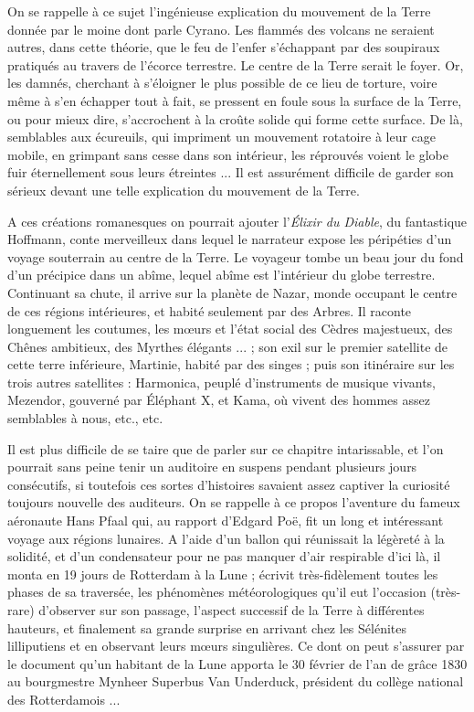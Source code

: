 \documentclass[a4paper, 11pt, oneside, landscape]{article}
\begin{document}
On se rappelle à ce sujet l'ingénieuse explication du mouvement de la Terre donnée par le moine dont parle Cyrano. Les flammés des volcans ne seraient autres, dans cette théorie, que le feu de l'enfer s'échappant par des soupiraux pratiqués au travers de l'écorce terrestre. Le centre de la Terre serait le foyer. Or, les damnés, cherchant à s'éloigner le plus possible de ce lieu de torture, voire même à s'en échapper tout à fait, se pressent en foule sous la surface de la Terre, ou pour mieux dire, s'accrochent à la croûte solide qui forme cette surface. De là, semblables aux écureuils, qui impriment un mouvement rotatoire à leur cage mobile, en grimpant sans cesse dans son intérieur, les réprouvés voient le globe fuir éternellement sous leurs étreintes ... Il est assurément difficile de garder son sérieux devant une telle explication du mouvement de la Terre.

A ces créations romanesques on pourrait ajouter l'\emph{Élixir du Diable}, du fantastique Hoffmann, conte merveilleux dans lequel le narrateur expose les péripéties d'un voyage souterrain au centre de la Terre. Le voyageur tombe un beau jour du fond d'un précipice dans un abîme, lequel abîme est l'intérieur du globe terrestre. Continuant sa chute, il arrive sur la planète de Nazar, monde occupant le centre de ces régions intérieures, et habité seulement par des Arbres. Il raconte longuement les coutumes, les mœurs et l'état social des Cèdres majestueux, des Chênes ambitieux, des Myrthes élégants ... ; son exil sur le premier satellite de cette terre inférieure, Martinie, habité par des singes ; puis son itinéraire sur les trois autres satellites : Harmonica, peuplé d'instruments de musique vivants, Mezendor, gouverné par Éléphant X, et Kama, où vivent des hommes assez semblables à nous, etc., etc.

Il est plus difficile de se taire que de parler sur ce chapitre intarissable, et l'on pourrait sans peine tenir un auditoire en suspens pendant plusieurs jours consécutifs, si toutefois ces sortes d'histoires savaient assez captiver la curiosité toujours nouvelle des auditeurs. On se rappelle à ce propos l'aventure du fameux aéronaute Hans Pfaal qui, au rapport d'Edgard Poë, fit un long et intéressant voyage aux régions lunaires. A l'aide d'un ballon qui réunissait la légèreté à la solidité, et d'un condensateur pour ne pas manquer d'air respirable d'ici là, il monta en 19 jours de Rotterdam à la Lune ; écrivit très-fidèlement toutes les phases de sa traversée, les phénomènes météorologiques qu'il eut l'occasion (très-rare) d'observer sur son passage, l'aspect successif de la Terre à différentes hauteurs, et finalement sa grande surprise en arrivant chez les Sélénites lilliputiens et en observant leurs mœurs singulières. Ce dont on peut s'assurer par le document qu'un habitant de la Lune apporta le 30 février de l'an de grâce 1830 au bourgmestre Mynheer Superbus Van Underduck, président du collège national des Rotterdamois ...
\end{document}
